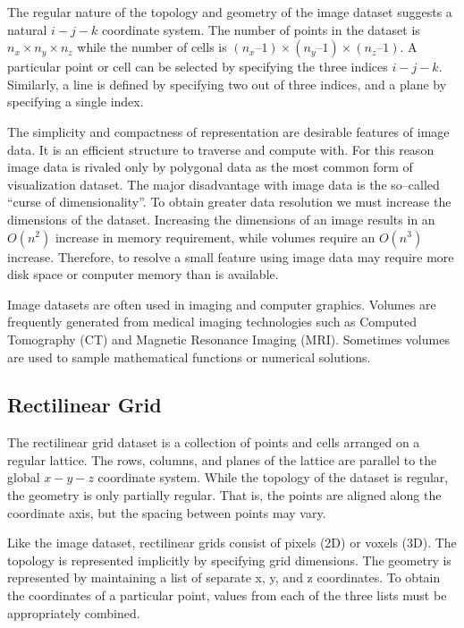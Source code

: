 The regular nature of the topology and geometry of the image dataset suggests a natural $i-j-k$ coordinate system. The number of points in the dataset is $n_x \times n_y \times n_z$ while the number of cells is $(n_x – 1) \times (n_y – 1) \times (n_z – 1)$. A particular point or cell can be selected by specifying the three indices $i-j-k$. Similarly, a line is defined by specifying two out of three indices, and a plane by specifying a single index.

The simplicity and compactness of representation are desirable features of image data. It is an efficient structure to traverse and compute with. For this reason image data is rivaled only by polygonal data as the most common form of visualization dataset. The major disadvantage with image data is the so--called ``curse of dimensionality''. To obtain greater data resolution we must increase the dimensions of the dataset. Increasing the dimensions of an image results in an $O(n^2)$ increase in memory requirement, while volumes require an $O(n^3)$ increase. Therefore, to resolve a small feature using image data may require more disk space or computer memory than is available.

Image datasets are often used in imaging and computer graphics. Volumes are frequently generated from medical imaging technologies such as Computed Tomography (CT) and Magnetic Resonance Imaging (MRI). Sometimes volumes are used to sample mathematical functions or numerical solutions.

\subsection{Rectilinear Grid}

The rectilinear grid dataset is a collection of points and cells arranged on a regular lattice. The rows, columns, and planes of the lattice are parallel to the global $x-y-z$ coordinate system. While the topology of the dataset is regular, the geometry is only partially regular. That is, the points are aligned along the coordinate axis, but the spacing between points may vary.

Like the image dataset, rectilinear grids consist of pixels (2D) or voxels (3D). The topology is represented implicitly by specifying grid dimensions. The geometry is represented by maintaining a list of separate x, y, and z coordinates. To obtain the coordinates of a particular point, values from each of the three lists must be appropriately combined.


